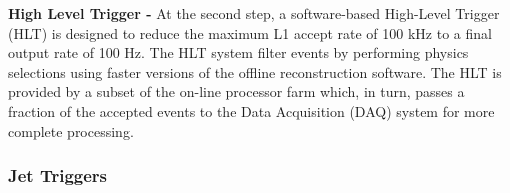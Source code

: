 {\bf High Level Trigger -} At the second step, a software-based High-Level Trigger (HLT) is designed to reduce the maximum L1 accept rate of 100 kHz to a final output rate of 100 Hz. The HLT system filter events by performing physics selections using faster versions of the offline reconstruction software. The HLT is provided by a subset of the on-line processor farm which, in turn, passes a fraction of the accepted events to the Data Acquisition (DAQ) system for more complete processing.

\subsubsection{Jet Triggers}
\begin{comment}
\begin{figure}[!h]
\begin{center}
\vspace*{3mm} 
\hspace*{-5mm}
\texttt{[image: /home/anter/Desktop/Thesis/Figures/Jet\_trigger.png]}\\
\vspace*{4mm}
\caption[Muon]{Illustration of the available tower granularity for the L1 jet finding algorithm in the
central region, |η|<3 (left). The jet trigger uses a 3×3 calorimeter region sliding windowtechnique which spans the full(η,φ)coverage ofthe calorimeter. The active tower patternsallowed for L1τjet candidates are shown on the right Workflow of the L1 trigger system \cite{Chatrchyan:2008aa}.}
\label{fig:Jettrigger}
\end{center}
\end{figure}
\end{comment}
